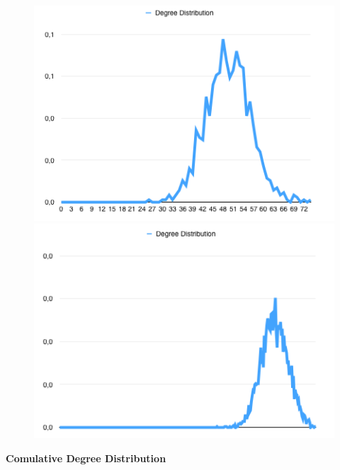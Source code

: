 \documentclass[a4paper,titlepage,11pt]{article}
\begin{document}
\begin{figure}[h]
    \centering
    \includegraphics[scale=0.50]{img/dd-1000-05.png}
    \includegraphics[scale=0.50]{img/dd-5000-05.png}
\end{figure}

\textbf{Comulative Degree Distribution}
\end{document}
